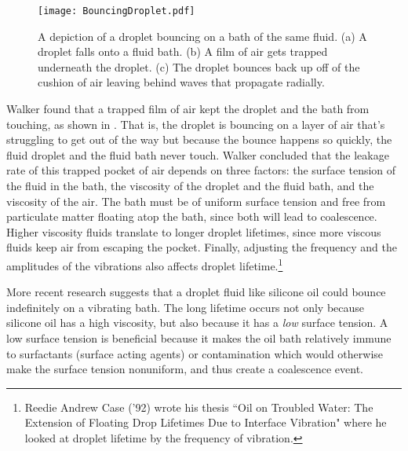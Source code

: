 \begin{figure}[h!]
	\centering
	\texttt{[image: BouncingDroplet.pdf]}
	\caption{A depiction of a droplet bouncing on a bath of the same fluid. (a) A droplet falls onto a fluid bath. (b) A film of air gets trapped underneath the droplet. (c) The droplet bounces back up off of the cushion of air leaving behind waves that propagate radially.}
	\label{bounce}
\end{figure}
	    
	    Walker found that a trapped film of air kept the droplet and the bath from touching, as shown in . That is, the droplet is bouncing on a layer of air that's struggling to get out of the way but because the bounce happens so quickly, the fluid droplet and the fluid bath never touch. Walker concluded that the leakage rate of this trapped pocket of air depends on three factors: the surface tension of the fluid in the bath, the viscosity of the droplet and the fluid bath, and the viscosity of the air. The bath must be of uniform surface tension and free from particulate matter floating atop the bath, since both will lead to coalescence. Higher viscosity fluids translate to longer droplet lifetimes, since more viscous fluids keep air from escaping the pocket. Finally, adjusting the frequency and the amplitudes of the vibrations also affects droplet lifetime.\footnote{Reedie Andrew Case ('92) wrote his thesis ``Oil on Troubled Water: The Extension of Floating Drop Lifetimes Due to Interface Vibration" where he looked at droplet lifetime by the frequency of vibration.}   
	     
	    More recent research suggests that a droplet fluid like silicone oil could bounce indefinitely on a vibrating bath. The long lifetime occurs not only because silicone oil has a high viscosity, but also because it has a \textit{low} surface tension. A low surface tension is beneficial because it makes the oil bath relatively immune to surfactants (surface acting agents) or contamination which would otherwise make the surface tension nonuniform, and thus create a coalescence event. 


